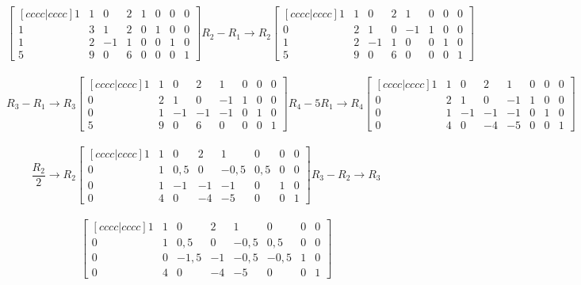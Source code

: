 \[
    \begin{bmatrix}[cccc|cccc]
        1 & 1 & 0  & 2 & 1 & 0 & 0 & 0 \\
        1 & 3 & 1  & 2 & 0 & 1 & 0 & 0 \\
        1 & 2 & -1 & 1 & 0 & 0 & 1 & 0 \\
        5 & 9 & 0  & 6 & 0 & 0 & 0 & 1
    \end{bmatrix}
    R_2 - R_1\to R_2
    \begin{bmatrix}[cccc|cccc]
        1 & 1 & 0  & 2 & 1  & 0 & 0 & 0 \\
        0 & 2 & 1  & 0 & -1 & 1 & 0 & 0 \\
        1 & 2 & -1 & 1 & 0  & 0 & 1 & 0 \\
        5 & 9 & 0  & 6 & 0  & 0 & 0 & 1
    \end{bmatrix}
\]
\\
\[
    R_3 - R_1\to R_3
    \begin{bmatrix}[cccc|cccc]
        1 & 1 & 0  & 2  & 1  & 0 & 0 & 0 \\
        0 & 2 & 1  & 0  & -1 & 1 & 0 & 0 \\
        0 & 1 & -1 & -1 & -1 & 0 & 1 & 0 \\
        5 & 9 & 0  & 6  & 0  & 0 & 0 & 1
    \end{bmatrix}
    R_4 - 5R_1\to R_4
    \begin{bmatrix}[cccc|cccc]
        1 & 1 & 0  & 2  & 1  & 0 & 0 & 0 \\
        0 & 2 & 1  & 0  & -1 & 1 & 0 & 0 \\
        0 & 1 & -1 & -1 & -1 & 0 & 1 & 0 \\
        0 & 4 & 0  & -4 & -5 & 0 & 0 & 1
    \end{bmatrix}
\]
\\
\[
    \frac{R_2}{2}\to R_2
    \begin{bmatrix}[cccc|cccc]
        1 & 1 & 0   & 2  & 1    & 0   & 0 & 0 \\
        0 & 1 & 0,5 & 0  & -0,5 & 0,5 & 0 & 0 \\
        0 & 1 & -1  & -1 & -1   & 0   & 1 & 0 \\
        0 & 4 & 0   & -4 & -5   & 0   & 0 & 1
    \end{bmatrix}
    R_3 - R_2\to R_3
\]
\\
\[
    \begin{bmatrix}[cccc|cccc]
        1 & 1 & 0    & 2  & 1    & 0    & 0 & 0 \\
        0 & 1 & 0,5  & 0  & -0,5 & 0,5  & 0 & 0 \\
        0 & 0 & -1,5 & -1 & -0,5 & -0,5 & 1 & 0 \\
        0 & 4 & 0    & -4 & -5   & 0    & 0 & 1
    \end{bmatrix}
\]
